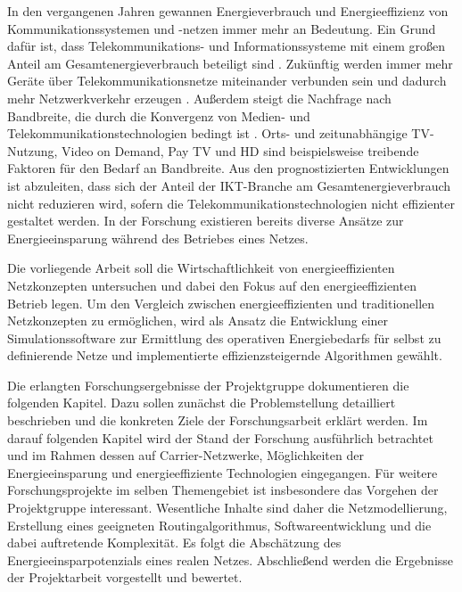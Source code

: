 In den vergangenen Jahren gewannen Energieverbrauch und Energieeffizienz von Kommunikationssystemen und -netzen immer mehr an Bedeutung. Ein Grund dafür ist, dass Telekommunikations- und Informationssysteme mit einem großen Anteil am Gesamtenergieverbrauch beteiligt sind \cite{fraunhofer:energiebedarf}. Zukünftig werden immer mehr Geräte über Telekommunikationsnetze miteinander verbunden sein und dadurch mehr Netzwerkverkehr erzeugen \cite{cisco}.  Außerdem steigt die Nachfrage nach Bandbreite, die durch die Konvergenz von Medien- und Telekommunikationstechnologien bedingt ist \cite{anga}.  Orts- und zeitunabhängige TV-Nutzung, Video on Demand, Pay TV und HD sind beispielsweise treibende Faktoren für den Bedarf an Bandbreite. Aus den prognostizierten Entwicklungen ist abzuleiten, dass sich der Anteil der IKT-Branche am Gesamtenergieverbrauch nicht reduzieren wird, sofern die Telekommunikationstechnologien nicht effizienter gestaltet werden. In der Forschung existieren bereits diverse Ansätze zur Energieeinsparung während des Betriebes eines Netzes.


Die vorliegende Arbeit soll die Wirtschaftlichkeit von energieeffizienten Netzkonzepten untersuchen und dabei den Fokus auf den energieeffizienten Betrieb legen. Um den Vergleich zwischen energieeffizienten und traditionellen Netzkonzepten zu ermöglichen, wird als Ansatz die Entwicklung einer Simulationssoftware zur Ermittlung des operativen Energiebedarfs für  selbst zu definierende Netze und implementierte effizienzsteigernde Algorithmen gewählt.


Die erlangten Forschungsergebnisse der Projektgruppe dokumentieren die folgenden Kapitel. Dazu sollen zunächst die Problemstellung detailliert beschrieben und die konkreten Ziele der Forschungsarbeit erklärt werden. Im darauf folgenden Kapitel wird der Stand der Forschung ausführlich betrachtet und im Rahmen dessen auf Carrier-Netzwerke, Möglichkeiten der Energieeinsparung und energieeffiziente Technologien eingegangen. Für weitere Forschungsprojekte im selben Themengebiet ist insbesondere das Vorgehen der Projektgruppe interessant. Wesentliche Inhalte sind daher die Netzmodellierung, Erstellung eines geeigneten Routingalgorithmus, Softwareentwicklung und die dabei auftretende Komplexität. Es folgt die Abschätzung des Energieeinsparpotenzials eines realen Netzes. Abschließend werden die Ergebnisse der Projektarbeit vorgestellt und bewertet. 

